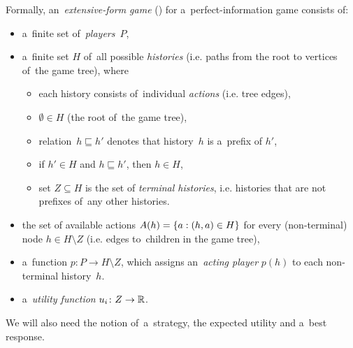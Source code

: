 Formally, an~\emph{extensive-form game} (\cite[p.~200]{Osborne1994course}) for a~perfect-information game consists of:
\begin{itemize}
  \item a~finite set of~\emph{players}~$P$,

  \item a~finite set $H$ of~all possible \emph{histories} (i.e. paths from the root to vertices of~the game tree), where
    \begin{itemize}
      \item each history consists of~individual \emph{actions} (i.e. tree edges),
      \item $\emptyset \in H$ (the root of~the game tree),
      \item relation~$h \sqsubseteq h'$ denotes that history~$h$ is a~prefix of $h'$,
      \item if $h' \in H$ and $h \sqsubseteq h'$, then $h \in H$,
      \item set $Z \subseteq H$ is the set of \emph{terminal histories}, i.e. histories that are not prefixes of~any other histories.
    \end{itemize}

  \item the set of available actions $A(h) = \left\{ a: (h, a) \in H \right\}$ for every (non-terminal) node $h \in H \setminus Z$ (i.e. edges to~children in the game tree),

  \item a~function $p\colon P \to H \setminus Z$, which assigns an~\emph{acting player} $p(h)$ to each non-terminal history~$h$.

  \item a~\emph{utility function} $u_i\colon Z \rightarrow \mathbb{R}$.
\end{itemize}
We will also need the notion of~a~strategy, the expected utility and a~best response.
